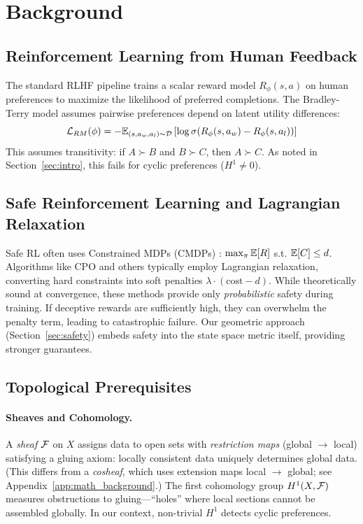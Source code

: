 \section{Background}
\label{sec:background}

\subsection{Reinforcement Learning from Human Feedback}

The standard RLHF pipeline \citep{christiano2017deep} trains a scalar reward model $R_\phi(s,a)$ on human preferences to maximize the likelihood of preferred completions. The Bradley-Terry model assumes pairwise preferences depend on latent utility differences:
\begin{equation}
\mathcal{L}_{RM}(\phi) = -\mathbb{E}_{(s, a_w, a_l) \sim \mathcal{D}} \left[ \log \sigma(R_\phi(s, a_w) - R_\phi(s, a_l)) \right]
\end{equation}
This assumes transitivity: if $A \succ B$ and $B \succ C$, then $A \succ C$. As noted in Section~\ref{sec:intro}, this fails for cyclic preferences ($H^1 \neq 0$).

\subsection{Safe Reinforcement Learning and Lagrangian Relaxation}

Safe RL often uses Constrained MDPs (CMDPs) \citep{altman1999constrained}: $\max_\pi \mathbb{E}[R]$ s.t. $\mathbb{E}[C] \le d$. Algorithms like CPO \citep{achiam2017constrained} and others \citep{ray2019benchmarking} typically employ Lagrangian relaxation, converting hard constraints into soft penalties $\lambda \cdot (\text{cost} - d)$. While theoretically sound at convergence, these methods provide only \emph{probabilistic} safety during training. If deceptive rewards are sufficiently high, they can overwhelm the penalty term, leading to catastrophic failure. Our geometric approach (Section~\ref{sec:safety}) embeds safety into the state space metric itself, providing stronger guarantees.

\subsection{Topological Prerequisites}

\paragraph{Sheaves and Cohomology.} A \emph{sheaf} $\mathcal{F}$ on $X$ assigns data to open sets with \emph{restriction maps} (global $\to$ local) satisfying a gluing axiom: locally consistent data uniquely determines global data. (This differs from a \emph{cosheaf}, which uses extension maps local $\to$ global; see Appendix~\ref{app:math_background}.) The first cohomology group $H^1(X, \mathcal{F})$ measures obstructions to gluing---``holes'' where local sections cannot be assembled globally. In our context, non-trivial $H^1$ detects cyclic preferences.


